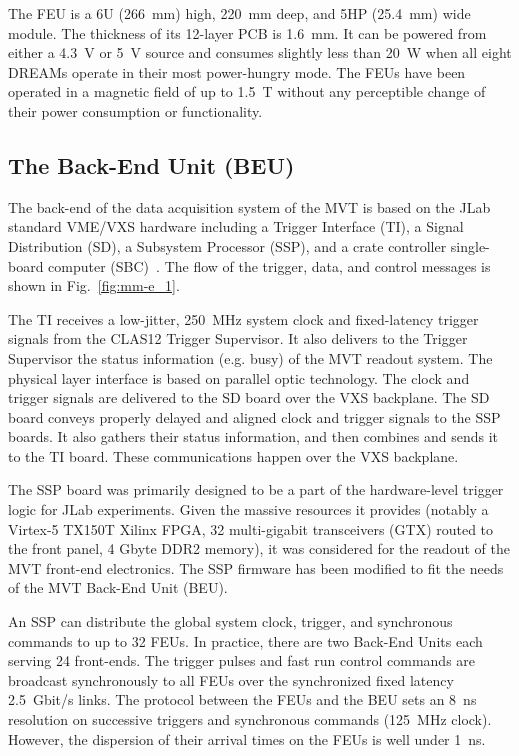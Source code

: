 The FEU is a 6U (266~mm) high, 220~mm deep, and 5HP (25.4~mm) wide module. The thickness of its 12-layer PCB is
1.6~mm. It can be powered from either a 4.3~V or 5~V source and consumes slightly less than 20~W when all eight
DREAMs operate in their most power-hungry mode. The FEUs have been operated in a magnetic field of up to 1.5~T
without any perceptible change of their power consumption or functionality.

\subsection{The Back-End Unit (BEU)}

The back-end of the data acquisition system of the MVT is based on the JLab standard VME/VXS hardware including a
Trigger Interface (TI), a Signal Distribution (SD), a Subsystem Processor (SSP), and a crate controller single-board
computer (SBC)~\cite{daq-nim}. The flow of the trigger, data, and control messages is shown in Fig.~\ref{fig:mm-e_1}. 

The TI receives a low-jitter, 250~MHz system clock and fixed-latency trigger signals from the CLAS12 Trigger
Supervisor. It also delivers to the Trigger Supervisor the status information (e.g. busy) of the MVT readout system. The
physical layer interface is based on parallel optic technology. The clock and trigger signals are delivered to the SD
board over the VXS backplane. The SD board conveys properly delayed and aligned clock and trigger signals to the SSP
boards. It also gathers their status information, and then combines and sends it to the TI board. These communications
happen over the VXS backplane.

The SSP board was primarily designed to be a part of the hardware-level trigger logic for JLab experiments. Given the
massive resources it provides (notably a Virtex-5 TX150T Xilinx FPGA, 32 multi-gigabit transceivers (GTX) routed to the
front panel, 4 Gbyte DDR2 memory), it was considered for the readout of the MVT front-end electronics. The SSP
firmware has been modified to fit the needs of the MVT Back-End Unit (BEU).

An SSP can distribute the global system clock, trigger, and synchronous commands to up to 32 FEUs. In practice, there
are two Back-End Units each serving 24 front-ends. The trigger pulses and fast run control commands are broadcast
synchronously to all FEUs over the synchronized fixed latency 2.5~Gbit/s links. The protocol between the FEUs and the
BEU sets an 8~ns resolution on successive triggers and synchronous commands (125~MHz clock). However, the dispersion
of their arrival times on the FEUs is well under 1~ns.

